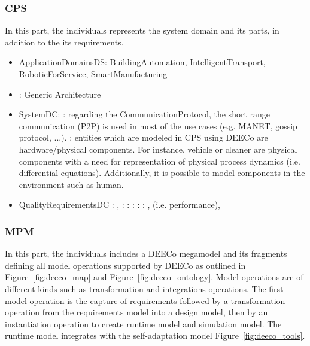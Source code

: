  \subsubsection{CPS}
In this part, the individuals represents the system domain and its parts, in addition to the its requirements.
 \begin{itemize}
     \item ApplicationDomainsDS: BuildingAutomation, IntelligentTransport, RoboticForService, SmartManufacturing
     \item {}: Generic Architecture
     \item SystemDC: 
        \subitem {}: regarding the CommunicationProtocol, the short range communication (P2P) is used in most of the use cases (e.g. MANET, gossip protocol, ...). 
        \subitem {}: entities which are modeled in CPS using DEECo are hardware/physical components. For instance, vehicle or cleaner are physical components with a need for representation of physical process dynamics (i.e. differential equations). Additionally, it is possible to model components in the environment such as human.
           
    \item QualityRequirementsDC
        \subitem {}: , 
        \subitem {}: 
        \subitem {}: 
        \subitem {}:  
        \subitem {}: 
        \subitem {}: ,  (i.e. performance),  
 \end{itemize}
 

 \subsubsection{MPM}
  In this part, the individuals includes a DEECo megamodel and its fragments defining all model operations supported by DEECo as outlined in Figure~\ref{fig:deeco_map} and Figure~\ref{fig:deeco_ontology}. Model operations are of different kinds such as transformation and integrations operations. The first model operation is the capture of requirements followed by a transformation operation from the requirements model into a design model, then by an instantiation operation to create runtime model and simulation model. The runtime model integrates with the self-adaptation model Figure~\ref{fig:deeco_tools}.

